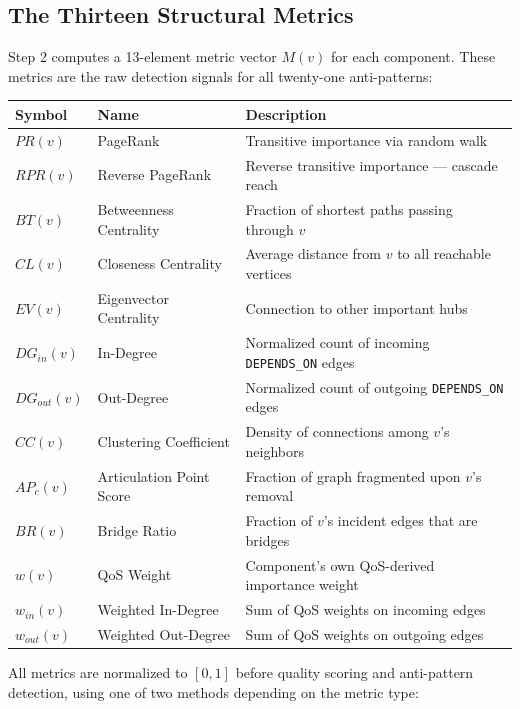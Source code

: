\documentclass[11pt]{article}
\begin{document}
\subsection{The Thirteen Structural Metrics}

Step 2 computes a 13-element metric vector $M(v)$ for each component. These metrics are the raw detection signals for all twenty-one anti-patterns:

\begin{center}
\begin{tabular}{@{}llp{7cm}@{}}
\toprule
\textbf{Symbol} & \textbf{Name} & \textbf{Description} \\
\midrule
$PR(v)$ & PageRank & Transitive importance via random walk \\
$RPR(v)$ & Reverse PageRank & Reverse transitive importance --- cascade reach \\
$BT(v)$ & Betweenness Centrality & Fraction of shortest paths passing through $v$ \\
$CL(v)$ & Closeness Centrality & Average distance from $v$ to all reachable vertices \\
$EV(v)$ & Eigenvector Centrality & Connection to other important hubs \\
$DG_{in}(v)$ & In-Degree & Normalized count of incoming \texttt{DEPENDS\_ON} edges \\
$DG_{out}(v)$ & Out-Degree & Normalized count of outgoing \texttt{DEPENDS\_ON} edges \\
$CC(v)$ & Clustering Coefficient & Density of connections among $v$'s neighbors \\
$AP_c(v)$ & Articulation Point Score & Fraction of graph fragmented upon $v$'s removal \\
$BR(v)$ & Bridge Ratio & Fraction of $v$'s incident edges that are bridges \\
$w(v)$ & QoS Weight & Component's own QoS-derived importance weight \\
$w_{in}(v)$ & Weighted In-Degree & Sum of QoS weights on incoming edges \\
$w_{out}(v)$ & Weighted Out-Degree & Sum of QoS weights on outgoing edges \\
\bottomrule
\end{tabular}
\end{center}

All metrics are normalized to $[0,1]$ before quality scoring and anti-pattern detection, using one of two methods depending on the metric type:
\end{document}
